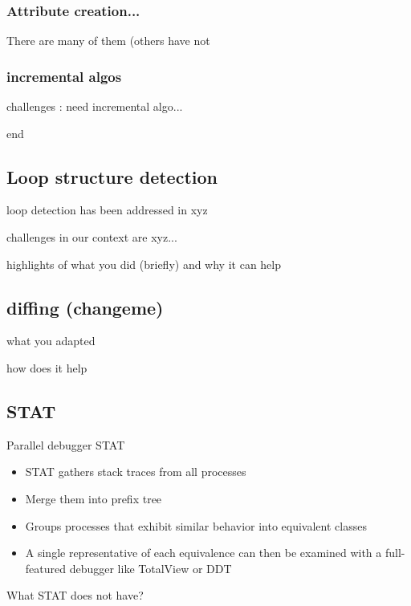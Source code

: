 \subsubsection{Attribute creation...}

There are many of them (others have not 

\subsubsection{incremental algos}

challenges : need incremental algo...

end




\subsection{Loop structure detection}

loop detection has been addressed in xyz

challenges in our context are xyz...

highlights of what you did (briefly) and why it can help

\subsection{diffing (changeme)}


what you adapted

how does it help

\cite{diff-myers}

\clearpage

\subsection{STAT}

Parallel debugger STAT\cite{stat}
\begin{itemize}
\item STAT gathers stack traces from all processes
\item Merge them into prefix tree
\item Groups processes that exhibit similar behavior into equivalent classes
\item A single representative of each equivalence can then be examined with a full-featured debugger like TotalView or DDT
\end{itemize}

What STAT does not have?

